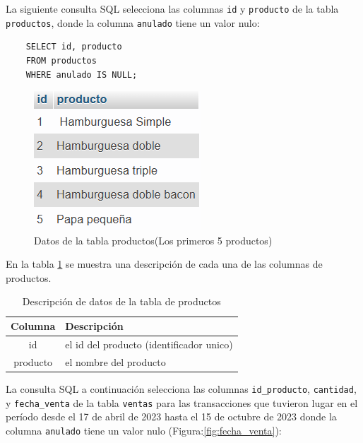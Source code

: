 La siguiente consulta SQL selecciona las columnas \texttt{id} y
\texttt{producto} de la tabla \texttt{productos}, donde la columna
\texttt{anulado} tiene un valor nulo:
\begin{center}
  \begin{verbatim}
    SELECT id, producto
    FROM productos
    WHERE anulado IS NULL;
  \end{verbatim}
\end{center}
\begin{figure}[H]
  \begin{center}
    \includegraphics[scale=0.90]{./primeros_5productos.png}
    \caption{Datos de la tabla productos(Los primeros 5 productos)}
    \label{fig:priemeros_5productos}
  \end{center}
\end{figure}

En la tabla \ref{tab:productos} se muestra una descripción de cada una de las
columnas de productos.

\begin{table}[H]

  \begin{tabular}{|c|l|}  %
    \hline
    \rowcolor{gray!50} \textbf{Columna} & \textbf{Descripción}                     \\
    \hline
    id                                  & el id del producto (identificador unico) \\
    producto                            & el nombre del producto                   \\
    \hline
  \end{tabular}
  \centering
  \caption{ Descripción de datos de la tabla de productos}
  \label{tab:productos} %
\end{table}

La consulta SQL a continuación selecciona las columnas \texttt{id\_producto},
\texttt{cantidad}, y \texttt{fecha\_venta} de la tabla \texttt{ventas} para las
transacciones que tuvieron lugar en el período desde el 17 de abril de 2023
hasta el 15 de octubre de 2023 donde la columna \texttt{anulado} tiene un valor
nulo (Figura:\ref{fig:fecha_venta}):

